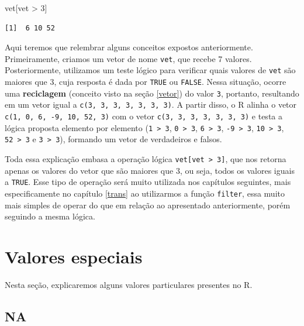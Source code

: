 \documentclass[
  brazilian,
]{book}
\newenvironment{Shaded}{\begin{snugshade}}{\end{snugshade}}
\newcommand{\DecValTok}[1]{\textcolor[rgb]{0.00,0.00,0.81}{#1}}
\newcommand{\NormalTok}[1]{#1}
\newcommand{\SpecialCharTok}[1]{\textcolor[rgb]{0.00,0.00,0.00}{#1}}
\begin{document}
\begin{Shaded}
\begin{Highlighting}[]
\NormalTok{vet[vet }\SpecialCharTok{\textgreater{}} \DecValTok{3}\NormalTok{]}
\end{Highlighting}
\end{Shaded}

\begin{verbatim}
[1]  6 10 52
\end{verbatim}

Aqui teremos que relembrar alguns conceitos expostos anteriormente. Primeiramente, criamos um vetor de nome \texttt{vet}, que recebe 7 valores. Posteriormente, utilizamos um teste lógico para verificar quais valores de \texttt{vet} são maiores que 3, cuja resposta é dada por \texttt{TRUE} ou \texttt{FALSE}. Nessa situação, ocorre uma \textbf{reciclagem} (conceito visto na seção \ref{vetor}) do valor \texttt{3}, portanto, resultando em um vetor igual a \texttt{c(3,\ 3,\ 3,\ 3,\ 3,\ 3,\ 3)}. A partir disso, o R alinha o vetor \texttt{c(1,\ 0,\ 6,\ -9,\ 10,\ 52,\ 3)} com o vetor \texttt{c(3,\ 3,\ 3,\ 3,\ 3,\ 3,\ 3)} e testa a lógica proposta elemento por elemento (\texttt{1\ \textgreater{}\ 3}, \texttt{0\ \textgreater{}\ 3}, \texttt{6\ \textgreater{}\ 3}, \texttt{-9\ \textgreater{}\ 3}, \texttt{10\ \textgreater{}\ 3}, \texttt{52\ \textgreater{}\ 3} e \texttt{3\ \textgreater{}\ 3}), formando um vetor de verdadeiros e falsos.

Toda essa explicação embasa a operação lógica \texttt{vet{[}vet\ \textgreater{}\ 3{]}}, que nos retorna apenas os valores do vetor que são maiores que 3, ou seja, todos os valores iguais a \texttt{TRUE}. Esse tipo de operação será muito utilizada nos capítulos seguintes, mais especificamente no capítulo \ref{trans} ao utilizarmos a função \texttt{filter}, essa muito mais simples de operar do que em relação ao apresentado anteriormente, porém seguindo a mesma lógica.

\hypertarget{especial}{%
\section{Valores especiais}\label{especial}}

Nesta seção, explicaremos alguns valores particulares presentes no R.

\hypertarget{na}{%
\subsection{NA}\label{na}}
\end{document}
